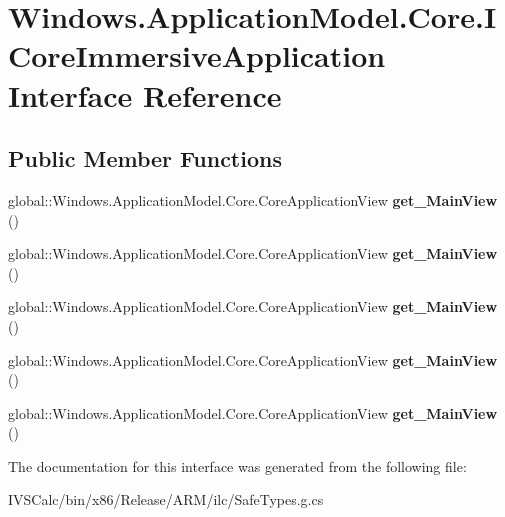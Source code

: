 \hypertarget{interface_windows_1_1_application_model_1_1_core_1_1_i_core_immersive_application}{}\section{Windows.\+Application\+Model.\+Core.\+I\+Core\+Immersive\+Application Interface Reference}
\label{interface_windows_1_1_application_model_1_1_core_1_1_i_core_immersive_application}
\subsection*{Public Member Functions}
\begin{DoxyCompactItemize}
\item 
\mbox{\label{interface_windows_1_1_application_model_1_1_core_1_1_i_core_immersive_application_a554d814538af5078a30d82279f5da015}} 
global\+::\+Windows.\+Application\+Model.\+Core.\+Core\+Application\+View {\bfseries get\+\_\+\+Main\+View} ()
\item 
\mbox{\label{interface_windows_1_1_application_model_1_1_core_1_1_i_core_immersive_application_a554d814538af5078a30d82279f5da015}} 
global\+::\+Windows.\+Application\+Model.\+Core.\+Core\+Application\+View {\bfseries get\+\_\+\+Main\+View} ()
\item 
\mbox{\label{interface_windows_1_1_application_model_1_1_core_1_1_i_core_immersive_application_a554d814538af5078a30d82279f5da015}} 
global\+::\+Windows.\+Application\+Model.\+Core.\+Core\+Application\+View {\bfseries get\+\_\+\+Main\+View} ()
\item 
\mbox{\label{interface_windows_1_1_application_model_1_1_core_1_1_i_core_immersive_application_a554d814538af5078a30d82279f5da015}} 
global\+::\+Windows.\+Application\+Model.\+Core.\+Core\+Application\+View {\bfseries get\+\_\+\+Main\+View} ()
\item 
\mbox{\label{interface_windows_1_1_application_model_1_1_core_1_1_i_core_immersive_application_a554d814538af5078a30d82279f5da015}} 
global\+::\+Windows.\+Application\+Model.\+Core.\+Core\+Application\+View {\bfseries get\+\_\+\+Main\+View} ()
\end{DoxyCompactItemize}


The documentation for this interface was generated from the following file\+:\begin{DoxyCompactItemize}
\item 
I\+V\+S\+Calc/bin/x86/\+Release/\+A\+R\+M/ilc/Safe\+Types.\+g.\+cs\end{DoxyCompactItemize}
